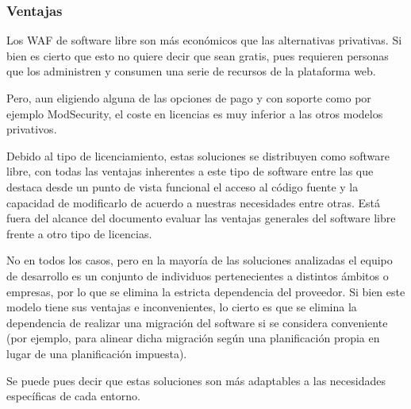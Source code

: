 \subsubsection{Ventajas}
\par Los WAF de software libre son más económicos que las alternativas privativas. Si bien es cierto que esto no quiere decir que sean gratis,
pues requieren personas que los administren y consumen una serie de recursos de la plataforma web.
\par Pero, aun eligiendo alguna de las opciones de pago y con soporte como por ejemplo ModSecurity, el coste en licencias es muy inferior a las
otros modelos privativos.
\par Debido al tipo de licenciamiento, estas soluciones se distribuyen como software libre, con todas las ventajas inherentes a este
tipo de software entre las que destaca desde un punto de vista funcional el acceso al código fuente y la capacidad de modificarlo de acuerdo a
nuestras necesidades entre otras. Está fuera del alcance del documento evaluar las ventajas generales del software libre frente a otro tipo de
licencias.
\par No en todos los casos, pero en la mayoría de las soluciones analizadas el equipo de desarrollo es un conjunto de individuos pertenecientes
a distintos ámbitos o empresas, por lo que se elimina la estricta dependencia del proveedor. Si bien este modelo tiene sus ventajas e
inconvenientes, lo cierto es que se elimina la dependencia de realizar una migración del software si se considera conveniente (por ejemplo,
para alinear dicha migración según una planificación propia en lugar de una planificación impuesta).
\par Se puede pues decir que estas soluciones son más adaptables a las necesidades específicas de cada entorno.

